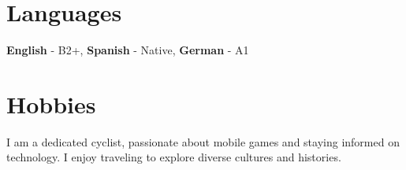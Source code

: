 \section*{Languages}
\textbf{English} - B2+, \textbf{Spanish} - Native, \textbf{German} - A1

\section*{Hobbies}
I am a dedicated cyclist, passionate about mobile games and staying informed on technology. I enjoy traveling to explore diverse cultures and histories.




